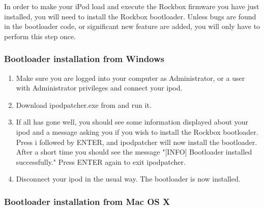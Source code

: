

In order to make your iPod load and execute the Rockbox firmware you
have just installed, you will need to install the Rockbox
bootloader. Unless bugs are found in the bootloader code, or
significant new feature are added, you will only have to perform this
step once.

\subsubsection{Bootloader installation from Windows}

\begin{enumerate}

\item Make sure you are logged into your computer as Administrator, or a 
user with Administrator privileges and connect your ipod.

\item Download ipodpatcher.exe from 
and run it.

\item If all has gone well, you should see some information displayed about
your ipod and a message asking you if you wish to install the Rockbox
bootloader. Press i followed by ENTER, and ipodpatcher will now
install the bootloader. After a short time you should see the message
"[INFO] Bootloader installed successfully." Press ENTER again to exit
ipodpatcher.

\item Disconnect your ipod in the usual way. The bootloader is now installed. 

\end{enumerate}

\subsubsection{Bootloader installation from Mac OS X}

